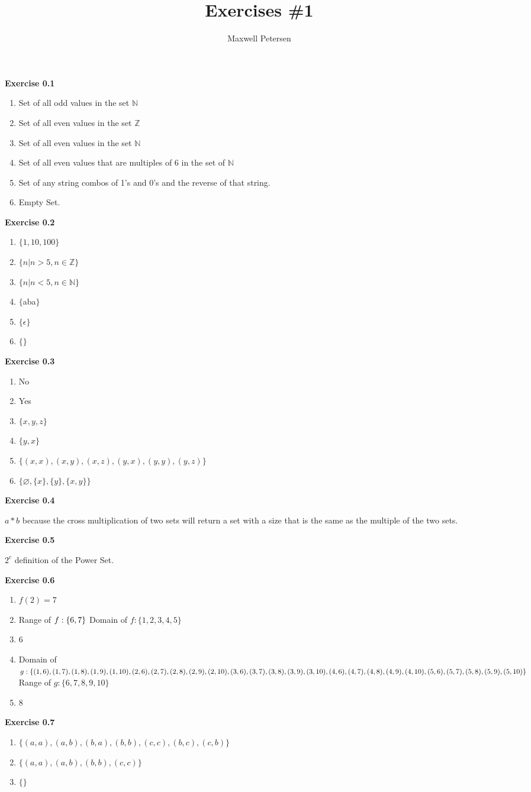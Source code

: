 \documentclass{article}
\title{Exercises \#1}
\author{Maxwell Petersen}
\makeatletter
\newcommand\exercise[1]{\par\vspace{4ex}\normalfont\normalsize\noindent
\textbf{\large Exercise #1}\par\nobreak\@afterindentfalse\@afterheading}
\makeatother
\begin{document}
\maketitle

\exercise{0.1}
\begin{enumerate}
\item Set of all odd values in the set $\mathbb{N}$ 
\item Set of all even values in the set $\mathbb{Z}$
\item Set of all even values in the set $\mathbb{N}$
\item Set of all even values that are multiples of 6 in the set of $\mathbb{N}$
\item Set of any string combos of 1's and 0's and the reverse of that string.
\item Empty Set.
\end{enumerate}

\exercise{0.2}
\begin{enumerate}
\item $\{ 1,10,100\}$
\item $\{ n | n > 5, n \in \mathbb{Z}\}$  
\item $\{ n | n < 5, n \in \mathbb{N}\}$ 
\item $\{ $aba$\}$
\item $\{ \epsilon \}$
\item $\{ \}$
\end{enumerate}

\exercise{0.3}
\begin{enumerate}
\item No
\item Yes
\item $\{ x,y,z \}$
\item $\{ y,x \}$
\item $\{ (x,x),(x,y),(x,z),(y,x),(y,y),(y,z) \}$
\item $\{ \varnothing,\{x\},\{y\},\{x,y\} \}$
\end{enumerate}

\exercise{0.4}
  $a * b$ because the cross multiplication of two sets will return a set with a size that is the same as the multiple of the two sets.

\exercise{0.5}
  $2^c$ definition of the Power Set.

\exercise{0.6}
\begin{enumerate}
\item $ f(2) = 7 $
\item Range of $f: \{6,7\}\newline $ Domain of $f: \{1,2,3,4,5\} $
\item 6
\item Domain of $g: \{(1,6),(1,7),(1,8),(1,9),(1,10),(2,6),(2,7),(2,8),(2,9),(2,10),(3,6),\newline(3,7),(3,8),(3,9),(3,10),(4,6),(4,7),(4,8),(4,9),(4,10),(5,6),(5,7),(5,8),(5,9),(5,10)\}\newline $ Range of $g: \{6,7,8,9,10\} $
\item 8
\end{enumerate}

\exercise{0.7}
\begin{enumerate}
\item $\{(a,a),(a,b),(b,a),(b,b),(c,c),(b,c),(c,b)\}$
\item $\{(a,a),(a,b),(b,b),(c,c)\}$
\item $\{\}$
\end{enumerate}
\end{document}
